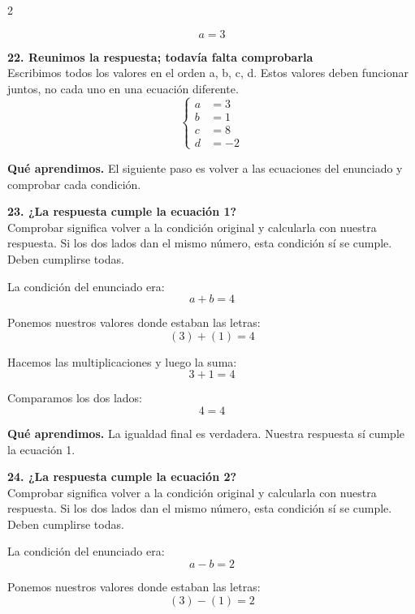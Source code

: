 \documentclass[11pt,a4paper,landscape]{article}
\begin{document}
\begin{multicols*}{2}
\begin{minipage}{\linewidth}
\[a=3\]
\end{minipage}\par\medskip
\noindent\begin{minipage}{\linewidth}\textbf{22. Reunimos la respuesta; todavía falta comprobarla}\\[2pt]Escribimos todos los valores en el orden a, b, c, d. Estos valores deben funcionar juntos, no cada uno en una ecuación diferente.
\[\left\{\begin{aligned}a&=3\\b&=1\\c&=8\\d&=-2\end{aligned}\right.\]
\par\smallskip\textbf{Qué aprendimos.} El siguiente paso es volver a las ecuaciones del enunciado y comprobar cada condición.
\end{minipage}\par\medskip
\noindent\begin{minipage}{\linewidth}\textbf{23. ¿La respuesta cumple la ecuación 1?}\\[2pt]Comprobar significa volver a la condición original y calcularla con nuestra respuesta. Si los dos lados dan el mismo número, esta condición sí se cumple. Deben cumplirse todas.
\par\smallskip La condición del enunciado era:
\[a + b = 4\]
\par\smallskip Ponemos nuestros valores donde estaban las letras:
\[\left(3\right) + \left(1\right)=4\]
\par\smallskip Hacemos las multiplicaciones y luego la suma:
\[3 + 1=4\]
\par\smallskip Comparamos los dos lados:
\[4=4\]
\par\smallskip\textbf{Qué aprendimos.} La igualdad final es verdadera. Nuestra respuesta sí cumple la ecuación 1.
\end{minipage}\par\medskip
\noindent\begin{minipage}{\linewidth}\textbf{24. ¿La respuesta cumple la ecuación 2?}\\[2pt]Comprobar significa volver a la condición original y calcularla con nuestra respuesta. Si los dos lados dan el mismo número, esta condición sí se cumple. Deben cumplirse todas.
\par\smallskip La condición del enunciado era:
\[a - b = 2\]
\par\smallskip Ponemos nuestros valores donde estaban las letras:
\[\left(3\right) - \left(1\right)=2\]

\end{minipage}
\end{multicols*}
\end{document}
